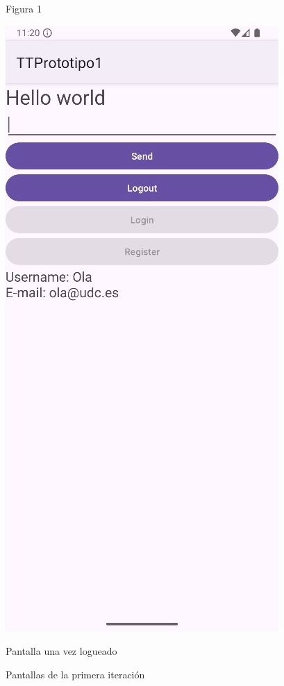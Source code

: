 \documentclass[a4paper,openright,12pt]{article}
\begin{document}
\begin{figure}[htp]
\begin{minipage}{0.45\textwidth}
        \caption{Figura 1}
        \label{fig:Pantalla de inicio}
    \end{minipage}
    \hfill
    \begin{minipage}{0.45\textwidth}
        \centering
        \includegraphics[width=\textwidth]{Images/Vista_It1_2.jpg}
        \caption{Pantalla una vez logueado}
        \label{fig:figura2}
    \end{minipage}
    \caption{Pantallas de la primera iteración}
    \label{fig:side_by_side}
\end{figure}
\end{document}
